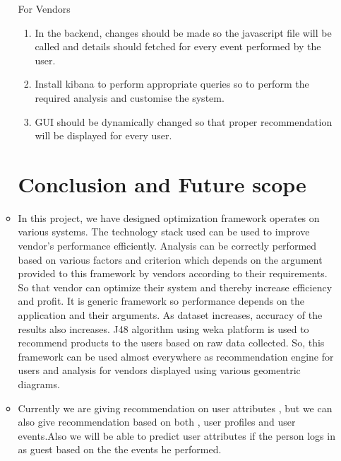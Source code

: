 \documentclass[oneside,a4paper,12pt]{book}
\begin{document}
\begin{enumerate}
\begin{itemize}
For Vendors
      \begin{enumerate}
\item In the backend, changes should be made so the javascript file will be called and details should fetched for every event performed by the user.
\item Install kibana to perform appropriate queries so to perform the required analysis and customise the system.
\item GUI should be dynamically changed so that proper recommendation will be displayed for every user.
\end{enumerate}
 \chapter{Conclusion and Future scope}
 \item In this project, we have designed optimization framework operates on various systems. The technology stack used can be used to improve vendor’s performance efficiently. Analysis can be correctly performed based on various factors and criterion which depends on the argument provided to this framework by vendors according to their requirements. So that vendor can optimize their system and thereby increase efficiency and profit. It is generic framework so performance depends on the application and their arguments. As dataset increases, accuracy of the results also increases. J48 algorithm using weka platform is used to recommend products to the users based on raw data collected. So, this framework can be used almost everywhere as recommendation engine for users and analysis for vendors displayed using various geomentric diagrams. 
 \item Currently we are giving recommendation on user attributes , but we can also give recommendation based on both , user profiles and user events.Also we will be able to predict user attributes if the person logs in as guest based on the the events he performed.  

% 




\begin{appendices}


\end{appendices}
\end{itemize}
\end{enumerate}
\end{document}
